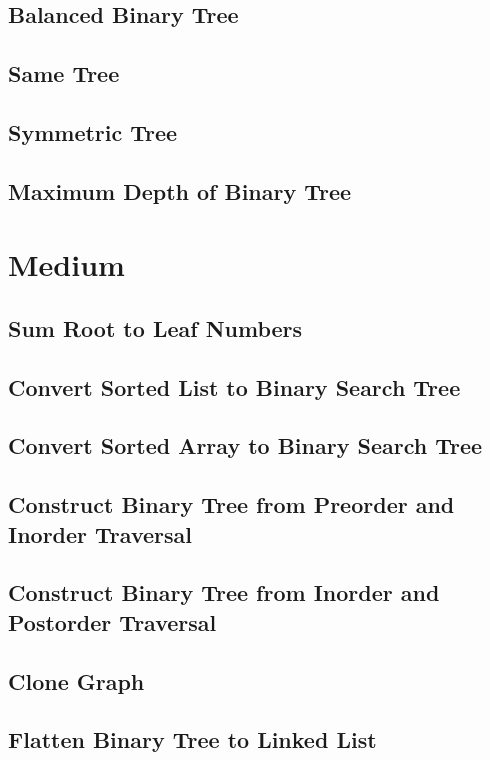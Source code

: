 \documentclass[11pt]{book}
\begin{document}
\subsection{Balanced Binary Tree}
\label{sec-8-1-2}
\subsection{Same Tree}
\label{sec-8-1-3}
\subsection{Symmetric Tree}
\label{sec-8-1-4}
\subsection{Maximum Depth of Binary Tree}
\label{sec-8-1-5}
\section{Medium}
\label{sec-8-2}
\subsection{Sum Root to Leaf Numbers}
\label{sec-8-2-1}
\subsection{Convert Sorted List to Binary Search Tree}
\label{sec-8-2-2}
\subsection{Convert Sorted Array to Binary Search Tree}
\label{sec-8-2-3}
\subsection{Construct Binary Tree from Preorder and Inorder Traversal}
\label{sec-8-2-4}
\subsection{Construct Binary Tree from Inorder and Postorder Traversal}
\label{sec-8-2-5}
\subsection{Clone Graph}
\label{sec-8-2-6}
\subsection{Flatten Binary Tree to Linked List}
\label{sec-8-2-7}
\end{document}
